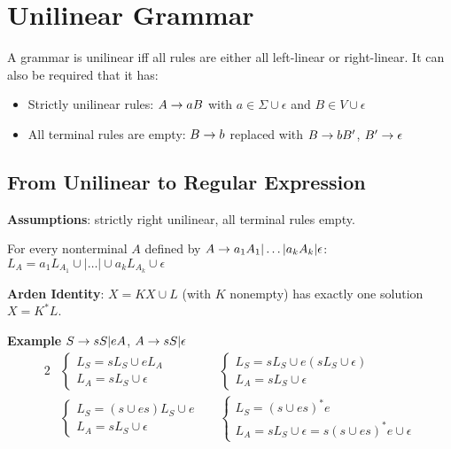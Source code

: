 \section{Unilinear Grammar}

A grammar is unilinear iff all rules are either all left-linear or right-linear. It can also be required that it has:
\begin{itemize}
    \item Strictly unilinear rules: $A \rightarrow aB$ with $a\in \Sigma \cup \epsilon$ and $B \in V \cup \epsilon$
    \item All terminal rules are empty: $B \rightarrow b$ replaced with $B \rightarrow bB'$, $B' \rightarrow \epsilon$
\end{itemize}

\subsection{From Unilinear to Regular Expression}

\textbf{Assumptions}: strictly right unilinear, all terminal rules empty.

For every nonterminal $A$ defined by $A \rightarrow a_1A_1|\ldots|a_kA_k|\epsilon$:
$L_A = a_1L_{A_1} \cup | \ldots | \cup a_kL_{A_k} \cup \epsilon$

\textbf{Arden Identity}: $X = KX \cup L$ (with $K$ nonempty) has exactly one solution $X = K^*L$.

\textbf{Example} $S \rightarrow sS | eA$, $A \rightarrow sS|\epsilon$
\begin{alignat*}{2}
&
    \begin{cases}
        L_S = sL_S \cup eL_A \\
        L_A = sL_S \cup \epsilon
    \end{cases}
&&
    \begin{cases}
        L_S = sL_S \cup e(sL_S \cup \epsilon) \\
        L_A = sL_S \cup \epsilon
    \end{cases}
\\
&
    \begin{cases}
        L_S = (s \cup es) L_S \cup e \\
        L_A = sL_S \cup \epsilon
    \end{cases}
&&
    \begin{cases}
        L_S = (s \cup es)^*e \\
        L_A = sL_S \cup \epsilon = s(s \cup es)^*e \cup \epsilon
    \end{cases}
\end{alignat*}
